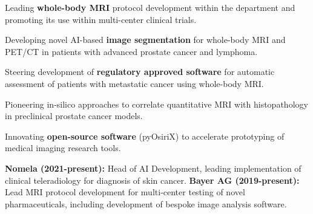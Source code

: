 \documentclass[]{mbcv}
\begin{document}
\begin{minipage}[t]{0.65\textwidth}
\vspace*{5pt}
\begin{tightemize}
\item Leading \textbf{whole-body MRI} protocol development within the department and promoting its use within multi-center clinical trials. 
\item Developing novel AI-based \textbf{image segmentation} for whole-body MRI and PET/CT in patients with advanced prostate cancer and lymphoma.
\item Steering development of \textbf{regulatory approved software} for automatic assessment of patients with metastatic cancer using whole-body MRI.
\item Pioneering in-silico approaches to correlate quantitative MRI with histopathology in preclinical prostate cancer models.
\item Innovating \textbf{open-source software} (pyOsiriX) to accelerate prototyping of medical imaging research tools.

\end{tightemize}

\sectionsep

\vspace*{5pt}
\textbf{Nomela (2021-present):} Head of AI Development,  leading implementation of clinical teleradiology for diagnosis of skin cancer.
\newline
\newline
\textbf{Bayer AG (2019-present):} Lead MRI protocol development for multi-center testing of novel pharmaceuticals, including development of bespoke image analysis software.


\end{minipage}

\newpage
\end{document}
